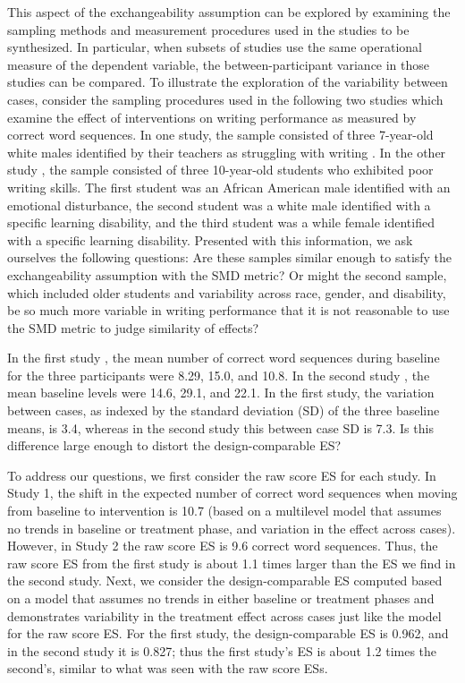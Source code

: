 \documentclass[
]{book}
\begin{document}
This aspect of the exchangeability assumption can be explored by examining the sampling methods and measurement procedures used in the studies to be synthesized. In particular, when subsets of studies use the same operational measure of the dependent variable, the between-participant variance in those studies can be compared. To illustrate the exploration of the variability between cases, consider the sampling procedures used in the following two studies which examine the effect of interventions on writing performance as measured by correct word sequences. In one study, the sample consisted of three 7-year-old white males identified by their teachers as struggling with writing \citep{parker2012Application}. In the other study \citep{stotz2008Effects}, the sample consisted of three 10-year-old students who exhibited poor writing skills. The first student was an African American male identified with an emotional disturbance, the second student was a white male identified with a specific learning disability, and the third student was a while female identified with a specific learning disability. Presented with this information, we ask ourselves the following questions: Are these samples similar enough to satisfy the exchangeability assumption with the SMD metric? Or might the second sample, which included older students and variability across race, gender, and disability, be so much more variable in writing performance that it is not reasonable to use the SMD metric to judge similarity of effects?

In the first study \citep{parker2012Application}, the mean number of correct word sequences during baseline for the three participants were 8.29, 15.0, and 10.8. In the second study \citep{stotz2008Effects}, the mean baseline levels were 14.6, 29.1, and 22.1. In the first study, the variation between cases, as indexed by the standard deviation (SD) of the three baseline means, is 3.4, whereas in the second study this between case SD is 7.3. Is this difference large enough to distort the design-comparable ES?

To address our questions, we first consider the raw score ES for each study. In Study 1, the shift in the expected number of correct word sequences when moving from baseline to intervention is 10.7 (based on a multilevel model that assumes no trends in baseline or treatment phase, and variation in the effect across cases). However, in Study 2 the raw score ES is 9.6 correct word sequences. Thus, the raw score ES from the first study is about 1.1 times larger than the ES we find in the second study. Next, we consider the design-comparable ES computed based on a model that assumes no trends in either baseline or treatment phases and demonstrates variability in the treatment effect across cases just like the model for the raw score ES. For the first study, the design-comparable ES is 0.962, and in the second study it is 0.827; thus the first study's ES is about 1.2 times the second's, similar to what was seen with the raw score ESs.
\end{document}

